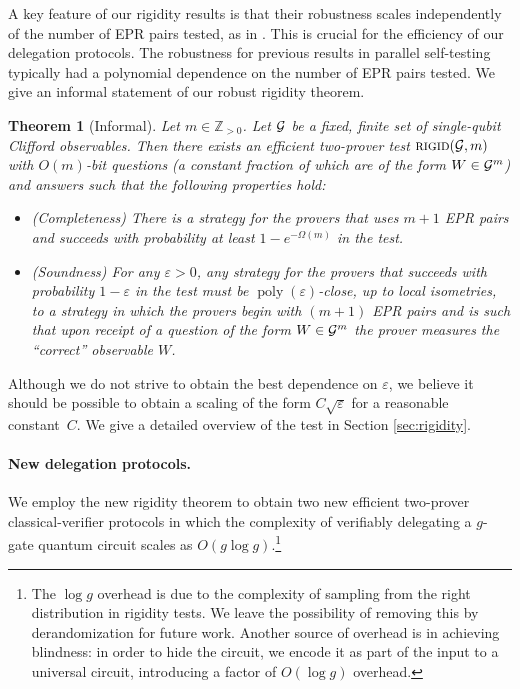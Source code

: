 \documentclass[11pt]{article}
\newtheorem{theorem}{Theorem}
\theoremstyle{remark}
\theoremstyle{definition}
\DeclareMathOperator{\poly}{poly}
\newcommand{\eps}{\varepsilon}
\begin{document}
 A key feature of our rigidity results is that their robustness scales independently of the number of EPR pairs tested, as in \cite{natarajan2016robust}. This is crucial for the efficiency of our delegation protocols. The robustness for previous results in parallel self-testing typically had a polynomial dependence on the number of EPR pairs tested. We give an informal statement of our robust rigidity theorem.
 
\begin{theorem}[Informal]\label{thm:rigid-informal}
Let $m\in\mathbb{Z}_{>0}$. Let $\cal G$ be a fixed, finite set of single-qubit Clifford observables. Then there exists an efficient two-prover test $\textsc{rigid}({\cal G},m)$ with $O(m)$-bit questions (a constant fraction of which are of the form $W\in{\cal G}^m$) and answers such that the following properties hold:
\begin{itemize}[nolistsep]
\item (Completeness) There is a strategy for the provers that uses $m+1$ EPR pairs and succeeds with probability at least $1 - e^{-\Omega(m)}$ in the test.
\item (Soundness) For any $\eps>0$, any strategy for the provers that succeeds with probability $1-\eps$ in the test must be $\poly(\eps)$-close, up to local isometries, to a strategy in which the provers begin with $(m+1)$ EPR pairs and is such that upon receipt of a question of the form $W\in {\cal G}^m$ the prover measures the ``correct'' observable $W$. 
\end{itemize}
\end{theorem}

Although we do not strive to obtain the best dependence on $\eps$, we believe it should be possible to obtain a scaling of the form $C\sqrt{\eps}$ for a reasonable constant~$C$. We give a detailed overview of the test in  Section \ref{sec:rigidity}. 


\paragraph{New delegation protocols.}
We employ the new rigidity theorem to obtain two new efficient
two-prover classical-verifier protocols in which the complexity of verifiably
delegating a $g$-gate quantum circuit scales as $O(g\log g)$.\footnote{The $\log
g$ overhead is due to the complexity of sampling from the right distribution in
rigidity tests. We leave the possibility of removing this by derandomization for
future work. Another source of overhead is in achieving blindness: in order to
hide the circuit, we encode it as part of the input to a universal circuit,
introducing a factor of $O(\log g)$ overhead.} 
\end{document}

